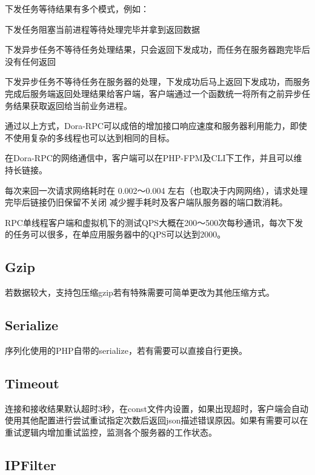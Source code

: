 下发任务等待结果有多个模式，例如：

\begin{compactitem}
\item 下发任务阻塞当前进程等待处理完毕并拿到返回数据
\item 下发异步任务不等待任务处理结果，只会返回下发成功，而任务在服务器跑完毕后没有任何返回
\item 下发异步任务不等待任务在服务器的处理，下发成功后马上返回下发成功，而服务完成后服务端返回处理结果给客户端，客户端通过一个函数统一将所有之前异步任务结果获取返回给当前业务进程。
\end{compactitem}

通过以上方式，Dora-RPC可以成倍的增加接口响应速度和服务器利用能力，即使不使用复杂的多线程也可以达到相同的目标。 

在Dora-RPC的网络通信中，客户端可以在PHP-FPM及CLI下工作，并且可以维持长链接。

每次来回一次请求网络耗时在 0.002～0.004 左右（也取决于内网网络），请求处理完毕后链接仍旧保留不关闭 减少握手耗时及客户端队服务器的端口数消耗。


RPC单线程客户端和虚拟机下的测试QPS大概在200～500次每秒通讯，每次下发的任务可以很多，在单应用服务器中的QPS可以达到2000。



\subsection{Gzip}


若数据较大，支持包压缩gzip若有特殊需要可简单更改为其他压缩方式。

\subsection{Serialize}


序列化使用的PHP自带的serialize，若有需要可以直接自行更换。

\subsection{Timeout}


连接和接收结果默认超时3秒，在const文件内设置，如果出现超时，客户端会自动使用其他配置进行尝试重试指定次数后返回json描述错误原因。如果有需要可以在重试逻辑内增加重试监控，监测各个服务器的工作状态。

\subsection{IPFilter}

